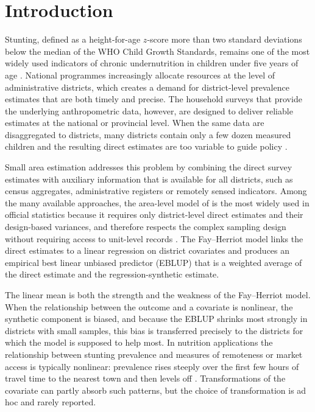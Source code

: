 \section{Introduction}
\label{sec:introduction}

Stunting, defined as a height-for-age $z$-score more than two standard
deviations below the median of the WHO Child Growth Standards, remains one of
the most widely used indicators of chronic undernutrition in children under five
years of age \citep{who2006growth}. National programmes increasingly allocate
resources at the level of administrative districts, which creates a demand for
district-level prevalence estimates that are both timely and precise. The
household surveys that provide the underlying anthropometric data, however, are
designed to deliver reliable estimates at the national or provincial level. When
the same data are disaggregated to districts, many districts contain only a few
dozen measured children and the resulting direct estimates are too variable to
guide policy \citep{rao2015small}.

Small area estimation addresses this problem by combining the direct survey
estimates with auxiliary information that is available for all districts, such
as census aggregates, administrative registers or remotely sensed indicators.
Among the many available approaches, the area-level model of
\citet{fay1979estimates} is the most widely used in official statistics because
it requires only district-level direct estimates and their design-based
variances, and therefore respects the complex sampling design without requiring
access to unit-level records \citep{pfeffermann2013new}. The Fay--Herriot model
links the direct estimates to a linear regression on district covariates and
produces an empirical best linear unbiased predictor (EBLUP) that is a weighted
average of the direct estimate and the regression-synthetic estimate.

The linear mean is both the strength and the weakness of the Fay--Herriot model.
When the relationship between the outcome and a covariate is nonlinear, the
synthetic component is biased, and because the EBLUP shrinks most strongly in
districts with small samples, this bias is transferred precisely to the
districts for which the model is supposed to help most. In nutrition
applications the relationship between stunting prevalence and measures of
remoteness or market access is typically nonlinear: prevalence rises steeply
over the first few hours of travel time to the nearest town and then levels off
\citep{alderman2012access,headey2018drivers}. Transformations of the covariate
can partly absorb such patterns, but the choice of transformation is ad hoc and
rarely reported.

